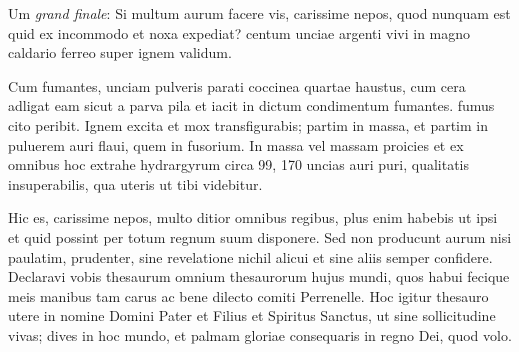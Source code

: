 \documentclass[
	12pt,				%
	oneside, %
	a4paper,			%
	english,			%
	brazil				%
	]{abntex2}
\begin{document}
Um \emph{grand finale}: Si multum aurum facere vis, carissime nepos, quod nunquam est quid ex incommodo et noxa expediat? centum unciae argenti vivi in ​​magno caldario ferreo super ignem validum.

Cum fumantes, unciam pulveris parati coccinea quartae haustus, cum cera adligat eam sicut a parva pila et iacit in dictum condimentum fumantes. fumus cito peribit. Ignem excita et mox transfigurabis; partim in massa, et partim in puluerem auri flaui, quem in fusorium. In massa vel massam proicies et ex omnibus hoc extrahe hydrargyrum circa 99, 170 uncias auri puri, qualitatis insuperabilis, qua uteris ut tibi videbitur. 

Hic es, carissime nepos, multo ditior omnibus regibus, plus enim habebis
ut ipsi et quid possint per totum regnum suum disponere. Sed non producunt aurum nisi paulatim, prudenter, sine revelatione nichil alicui et sine aliis semper confidere. Declaravi vobis thesaurum omnium thesaurorum hujus mundi, quos habui fecique meis manibus tam carus ac bene dilecto comiti Perrenelle. Hoc igitur thesauro utere in nomine Domini Pater et Filius et Spiritus Sanctus, ut sine sollicitudine vivas; dives in hoc mundo, et palmam gloriae consequaris in regno Dei, quod volo.

\postextual

\printbibliography[title=Referências]

%
%
\end{document}
